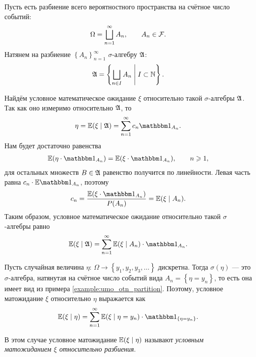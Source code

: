 \documentclass[../main.tex]{subfiles}
\begin{document}
 \begin{exmpl}
  \label{example:umo_otn_partition}
  Пусть есть разбиение всего вероятностного пространства на счётное число событий:
  \begin{align*}
   \Omega = \bigsqcup_{n=1}^{\infty} A_n, \qquad A_n \in \mathcal F.
  \end{align*} Натянем на разбиение $ \left\{A_n \right\}_{n=1}^{\infty} $ $ \sigma $-алгебру $ \mathfrak A $:
  \begin{align*}
   \mathfrak A = \left\{ \bigsqcup_{n \in I} A_n \;\middle|\; I \subset \mathbb{N} \right\}.
  \end{align*} 

  Найдём условное математическое ожидание $ \xi $ относительно такой $ \sigma $-алгебры $ \mathfrak A $. Так как оно измеримо относительно $ \mathfrak A $, то
  \begin{align*}
   \eta = \E(\xi \mid \A) = \sum_{n=1}^{\infty} c_n \Ind_{A_n}.
   \end{align*} Нам будет достаточно равенства \begin{align*}
   \E(\eta\cdot\Ind_{A_n}) = \E(\xi\cdot\Ind_{A_n}), \qquad n \geqslant 1,
  \end{align*} для остальных множеств $ B \in \mathfrak A $ равенство получится по линейности. Левая часть равна $ c_n \cdot \E \Ind_{A_n} $, поэтому
  \begin{align*}
   c_n = \frac{\E(\xi \cdot \Ind_{A_n})}{P(A_n)} = \E(\xi \mid A_n).
  \end{align*} Таким образом, условное математическое ожидание относительно такой $ \sigma $-алгебры равно
  \begin{align*}
   \E(\xi \mid \A) = \sum_{n=1}^{\infty} \E(\xi\mid A_n)  \cdot \Ind_{A_n}.
  \end{align*}
 \end{exmpl}

 \begin{remrk}
  Пусть случайная величина $ \eta \colon\,\Omega \to \left\{ y_1, y_2, y_3, \ldots \right\} $ дискретна. Тогда $ \sigma(\eta) $ --- это $ \sigma $-алгебра, натянутая на счётное число событий вида $ A_n = \left\{ \eta = y_n \right\} $, то есть она имеет вид из примера \ref{example:umo_otn_partition}. Поэтому, условное матожидание $ \xi $ относительно $ \eta $ выражается как
  \begin{align*}
   \E(\xi \mid \eta) = \sum_{n=1}^{\infty} \E(\xi \mid \eta = y_n) \cdot \Ind_{\left\{ \eta = y_n \right\}}.
  \end{align*}

  В этом случае условное матожидание $ \mathbb E(\xi \mid \eta) $ называют \textit{условным матожиданием $ \xi $ относительно разбиения}.
 \end{remrk}
 
\end{document}
